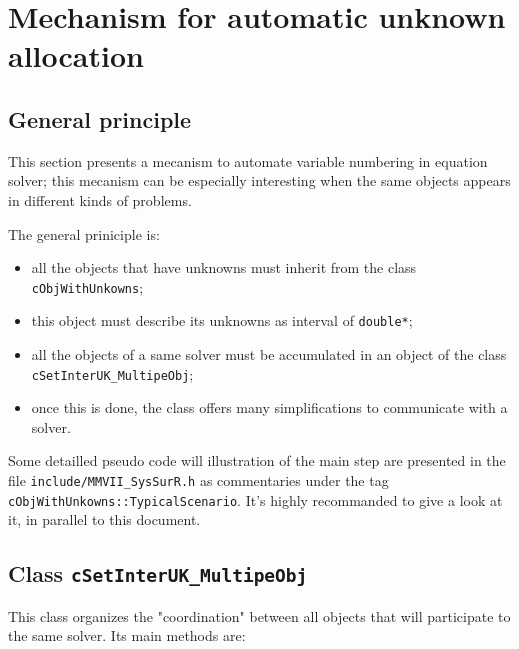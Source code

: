 \section{Mechanism for automatic unknown allocation}

\label{SecAutoUkAlloc}


\subsection{General principle}

This section presents a mecanism to automate variable numbering in 
equation solver; this mecanism can be especially interesting when the same objects 
appears in different kinds of problems.

The general priniciple is:

\begin{itemize}
     \item all the objects that have unknowns must inherit from the class {\tt cObjWithUnkowns};

     \item this object must describe its unknowns as interval of {\tt double*};

     \item  all the objects of a same solver must be accumulated in an object of the class
            {\tt cSetInterUK\_MultipeObj};

      \item once this is done, the class offers many simplifications to communicate with a solver.
     
\end{itemize}


Some detailled pseudo code will illustration of the main step are presented in 
the file  {\tt include/MMVII\_SysSurR.h}  as commentaries under the tag {\tt cObjWithUnkowns::TypicalScenario}.
It's highly recommanded to give a look at it, in parallel to this document.



\subsection{Class {\tt cSetInterUK\_MultipeObj}}

This class organizes the "coordination" between all objects that will participate to the same solver.
Its main methods are:

